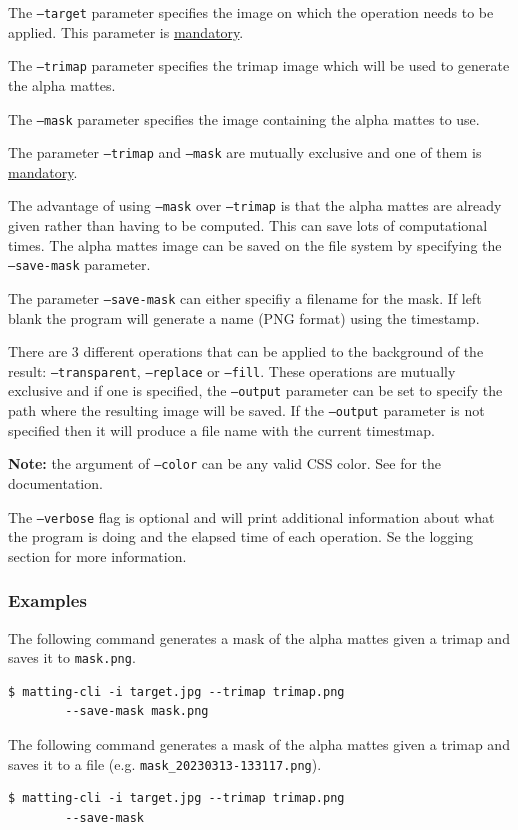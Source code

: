 \documentclass[a4paper]{article}
\begin{document}
The \texttt{--target} parameter specifies the image
on which the operation needs to be applied.
This parameter is \underline{mandatory}.

The \texttt{--trimap} parameter specifies the trimap
image which will be used to generate the alpha mattes.

The \texttt{--mask} parameter specifies the image
containing the alpha mattes to use.

The parameter \texttt{--trimap} and \texttt{--mask}
are mutually exclusive and one of them is \underline{mandatory}.

The advantage of using \texttt{--mask} over
\texttt{--trimap} is that the alpha mattes are
already given rather than having to be computed.
This can save lots of computational times.
The alpha mattes image can be saved on the file system
by specifying the \texttt{--save-mask} parameter.

The parameter \texttt{--save-mask} can either specifiy a filename
for the mask. If left blank the program will generate a name (PNG format)
using the timestamp.

There are 3 different operations that can be applied
to the background of the result: \texttt{--transparent},
\texttt{--replace} or \texttt{--fill}.
These operations are mutually exclusive and if one is specified,
the \texttt{--output} parameter can be set to
specify the path where the resulting image will be saved.
If the \texttt{--output} parameter is not specified then it will produce
a file name with the current timestmap.

\textbf{Note:} the argument of \texttt{--color} can be any valid
CSS color. See \cite{csscolors} for the documentation.

The \texttt{--verbose} flag is optional and will print additional
information about what the program is doing and the elapsed
time of each operation. Se the logging section for more information.

\subsubsection{Examples}

The following command generates a mask of the alpha mattes
given a trimap and saves it to \texttt{mask.png}.
\begin{lstlisting}[style=boxed]
    $ matting-cli -i target.jpg --trimap trimap.png
        --save-mask mask.png
\end{lstlisting}

The following command generates a mask of the alpha mattes
given a trimap and saves it to a file (e.g. \texttt{mask\_20230313-133117.png}).
\begin{lstlisting}[style=boxed]
    $ matting-cli -i target.jpg --trimap trimap.png
        --save-mask
\end{lstlisting}
\end{document}
